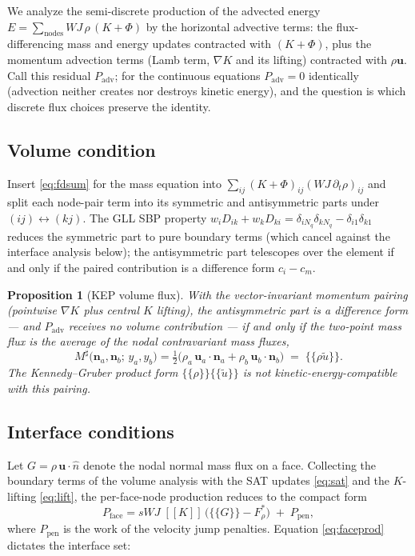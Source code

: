 \documentclass[11pt]{article}
\newcommand{\uu}{\boldsymbol{u}}
\newcommand{\jump}[1]{[\![#1]\!]}
\newcommand{\avg}[1]{\{\!\!\{#1\}\!\!\}}
\newtheorem{prop}{Proposition}
\begin{document}
We analyze the semi-discrete production of the advected energy
$E = \sum_{\mathrm{nodes}} WJ\,\rho\,(K + \Phi)$ by the horizontal
advective terms: the flux-differencing mass and energy updates contracted
with $(K+\Phi)$, plus the momentum advection terms (Lamb term, $\nabla K$
and its lifting) contracted with $\rho\uu$. Call this residual
$P_{\mathrm{adv}}$; for the continuous equations $P_{\mathrm{adv}} = 0$
identically (advection neither creates nor destroys kinetic energy), and
the question is which discrete flux choices preserve the identity.

\subsection{Volume condition}

Insert \eqref{eq:fdsum} for the mass equation into
$\sum_{ij} (K+\Phi)_{ij} (WJ\,\partial_t\rho)_{ij}$ and split each
node-pair term into its symmetric and antisymmetric parts under
$(ij)\leftrightarrow(kj)$. The GLL SBP property
$w_i D_{ik} + w_k D_{ki} = \delta_{iN_q}\delta_{kN_q} -
\delta_{i1}\delta_{k1}$ reduces the symmetric part to pure boundary
terms (which cancel against the interface analysis below); the
antisymmetric part telescopes over the element if and only if the paired
contribution is a difference form $c_i - c_m$.

\begin{prop}[KEP volume flux]
With the vector-invariant momentum pairing (pointwise $\nabla K$ plus
central $K$ lifting), the antisymmetric part is a difference form --- and
$P_{\mathrm{adv}}$ receives no volume contribution --- if and only if the
two-point mass flux is the average of the nodal contravariant mass
fluxes,
\begin{equation}
M^\sharp\big(\boldsymbol{n}_a, \boldsymbol{n}_b;\, y_a, y_b\big)
= \tfrac12\big(\rho_a\, \uu_a\!\cdot\!\boldsymbol{n}_a
             + \rho_b\, \uu_b\!\cdot\!\boldsymbol{n}_b\big)
\;=\; \avg{\rho \tilde u}.
\end{equation}
The Kennedy--Gruber product form $\avg{\rho}\avg{\tilde u}$ is
\emph{not} kinetic-energy-compatible with this pairing.
\end{prop}

\subsection{Interface conditions}

Let $G = \rho\,\uu\cdot\hat n$ denote the nodal normal mass flux on a
face. Collecting the boundary terms of the volume analysis with the SAT
updates \eqref{eq:sat} and the $K$-lifting \eqref{eq:lift}, the
per-face-node production reduces to the compact form
\begin{equation}
P_{\mathrm{face}}
= s\!W\!J\;\jump{K}\,\big(\avg{G} - F^*_\rho\big)
\;+\; P_{\mathrm{pen}},
\label{eq:faceprod}
\end{equation}
where $P_{\mathrm{pen}}$ is the work of the velocity jump penalties.
Equation \eqref{eq:faceprod} dictates the interface set:
\end{document}
